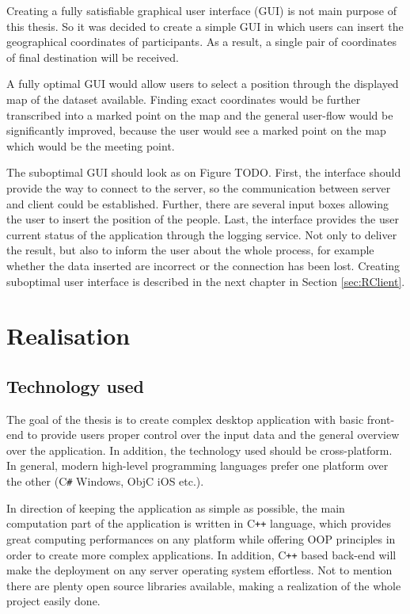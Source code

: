 \documentclass[thesis=M,english]{FITthesis}[2012/10/20]
\begin{document}
Creating a fully satisfiable graphical user interface (GUI) is not main purpose of this thesis. So it was decided to create a simple GUI in which users can insert the geographical coordinates of participants. As a result, a single pair of coordinates of final destination will be received. 

A fully optimal GUI would allow users to select a position through the displayed map of the dataset available. Finding exact coordinates would be further transcribed into a marked point on the map and the general user-flow would be significantly improved, because the user would see a marked point on the map which would be the meeting point. 

The suboptimal GUI should look as on Figure TODO. First, the interface should provide the way to connect to the server, so the communication between server and client could be established. Further, there are several input boxes allowing the user to insert the position of the people. Last, the interface provides the user current status of the application through the logging service. Not only to deliver the result, but also to inform the user about the whole process, for example whether the data inserted are incorrect or the connection has been lost.
Creating suboptimal user interface is described in the next chapter in Section \ref{sec:RClient}.

\chapter{Realisation}
\label{ch:Realisation}

\section{Technology used}
The goal of the thesis is to create complex desktop application with basic front-end to provide users proper control over the input data and the general overview over the application. In addition, the technology used should be cross-platform. In general, modern high-level programming languages prefer one platform over the other (C\texttt{\#} Windows, ObjC iOS etc.). 

In direction of keeping the application as simple as possible, the main computation part of the application is written in C\texttt{++} language, which provides great computing performances on any platform while offering OOP principles in order to create more complex applications. In addition, C\texttt{++} based back-end will make the deployment on any server operating system effortless. Not to mention there are plenty open source libraries available, making a realization of the whole project easily done.  
\end{document}
